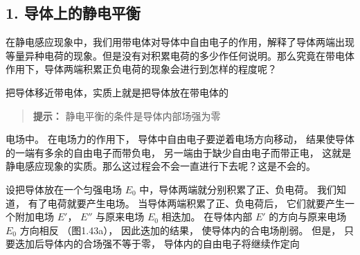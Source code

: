\subsection{1.
导体上的静电平衡}\label{ux5bfcux4f53ux4e0aux7684ux9759ux7535ux5e73ux8861}

在静电感应现象中，我们用带电体对导体中自由电子的作用，解释了导体两端出现等量异种电荷的现象。但是没有对积累电荷的多少作任何说明。那么究竟在带电体作用下，导体两端积累正负电荷的现象会进行到怎样的程度呢？

把导体移近带电体，实质上就是把导体放在带电体的

\begin{quote}
\textbf{提示：} 静电平衡的条件是导体内部场强为零
\end{quote}

电场中。 在电场力的作用下， 导体中自由电子要逆着电场方向移动，
结果使导体的一端有多余的自由电子而带负电，
另一端由于缺少自由电子而带正电，
这就是静电感应现象的实质。那么这过程会不会一直进行下去呢？这是不会的。

设把导体放在一个匀强电场 \(E_0\) 中，导体两端就分别积累了正、负电荷。
我们知道， 有了电荷就要产生电场。 当导体两端积累了正、负电荷后，
它们就要产生一个附加电场 \(E'\)， \(E''\) 与原来电场 \(E_0\) 相迭加。
在导体内部 \(E'\) 的方向与原来电场 \(E_0\) 方向相反 （图1.43a），
因此迭加的结果， 使导体内的合电场削弱。 但是，
只要迭加后导体内的合场强不等于零， 导体内的自由电子将继续作定向

